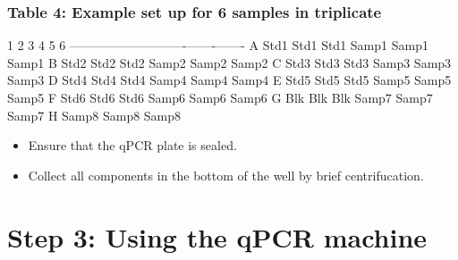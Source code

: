 \documentclass[
  letterpaper,
  DIV=11,
  numbers=noendperiod]{scrreprt}
\begin{document}
\hypertarget{table-4-example-set-up-for-6-samples-in-triplicate}{%
\subsubsection*{\texorpdfstring{\textbf{Table 4: Example set up for 6
samples in
triplicate}}{Table 4: Example set up for 6 samples in triplicate}}\label{table-4-example-set-up-for-6-samples-in-triplicate}}

\textbar{} \textbar{} 1 \textbar{} 2 \textbar{} 3 \textbar{} 4
\textbar{} 5 \textbar{} 6 \textbar{}
\textbar---\textbar------\textbar------\textbar------\textbar-------\textbar-------\textbar-------\textbar{}
\textbar{} A \textbar{} Std1 \textbar{} Std1 \textbar{} Std1 \textbar{}
Samp1 \textbar{} Samp1 \textbar{} Samp1 \textbar{} \textbar{} B
\textbar{} Std2 \textbar{} Std2 \textbar{} Std2 \textbar{} Samp2
\textbar{} Samp2 \textbar{} Samp2 \textbar{} \textbar{} C \textbar{}
Std3 \textbar{} Std3 \textbar{} Std3 \textbar{} Samp3 \textbar{} Samp3
\textbar{} Samp3 \textbar{} \textbar{} D \textbar{} Std4 \textbar{} Std4
\textbar{} Std4 \textbar{} Samp4 \textbar{} Samp4 \textbar{} Samp4
\textbar{} \textbar{} E \textbar{} Std5 \textbar{} Std5 \textbar{} Std5
\textbar{} Samp5 \textbar{} Samp5 \textbar{} Samp5 \textbar{} \textbar{}
F \textbar{} Std6 \textbar{} Std6 \textbar{} Std6 \textbar{} Samp6
\textbar{} Samp6 \textbar{} Samp6 \textbar{} \textbar{} G \textbar{} Blk
\textbar{} Blk \textbar{} Blk \textbar{} Samp7 \textbar{} Samp7
\textbar{} Samp7 \textbar{} \textbar{} H \textbar{} \textbar{}
\textbar{} \textbar{} Samp8 \textbar{} Samp8 \textbar{} Samp8 \textbar{}

\begin{itemize}
\item
  Ensure that the qPCR plate is sealed.
\item
  Collect all components in the bottom of the well by brief
  centrifucation.
\end{itemize}

\hypertarget{step-3-using-the-qpcr-machine}{%
\section*{\texorpdfstring{\textbf{Step 3: Using the qPCR
machine}}{Step 3: Using the qPCR machine}}\label{step-3-using-the-qpcr-machine}}
\end{document}
